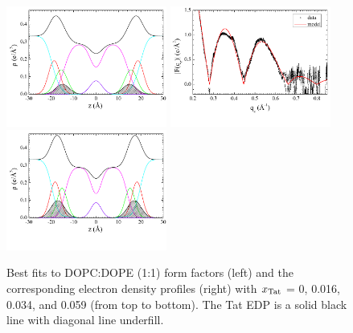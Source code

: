\begin{figure}[htbp]
  \includegraphics[trim=5 30 0 0,clip=true,width=0.47\textwidth]{figures/Tat/SDP_Results/EDP/DOPCDOPE1to1_Tat_28to1_3p0_EDP1}
  \includegraphics[trim=5 30 0 0,clip=true,width=0.47\textwidth]{figures/Tat/SDP_Results/XFF/DOPCDOPE1to1_Tat_16to1_3p0_XFF1}
  \includegraphics[trim=5 30 0 0,clip=true,width=0.47\textwidth]{figures/Tat/SDP_Results/EDP/DOPCDOPE1to1_Tat_16to1_3p0_EDP1}
  \caption[Best fits to DOPC:DOPE (1:1) form factors (left) and the corresponding 
  electron density profiles (right) with $\xTat$ = 0, 0.016, 0.034, 
  and 0.059 (from top to bottom)]
  {Best fits to DOPC:DOPE (1:1) form factors (left) and the corresponding 
  electron density profiles (right) with $\xTat$ = 0, 0.016, 0.034, 
  and 0.059 (from top to bottom).
  The Tat EDP is a solid black line with diagonal line underfill.}
  \label{fig:DOPCDOPE1to1_Tat_XFF1}
\end{figure}


